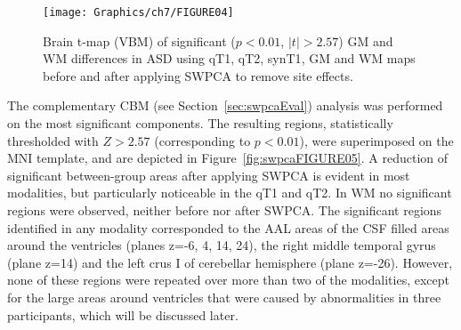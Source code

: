 \begin{figure}
	\centering
	\texttt{[image: Graphics/ch7/FIGURE04]}
	\caption[Brain t-map (\acs{VBM}) of significant ($p<0.01$, $|t|>2.57$) \acs{GM} and \acs{WM} differences in \acs{ASD} using \acs{qT1}, \acs{qT2}, \acs{synT1}, \acs{GM} and \acs{WM} maps before and after applying \acs{SWPCA} to remove site effects.]{Brain t-map (\ac{VBM}) of significant ($p<0.01$, $|t|>2.57$) \ac{GM} and \ac{WM} differences in \ac{ASD} using \ac{qT1}, \ac{qT2}, \ac{synT1}, \ac{GM} and \ac{WM} maps before and after applying \ac{SWPCA} to remove site effects.}
	\label{fig:swpcaFIGURE04}
\end{figure}

The complementary CBM (see Section~\ref{sec:swpcaEval}) analysis was performed on the most significant components. The resulting regions, statistically thresholded with $Z>2.57$ (corresponding to $p<0.01$), were superimposed on the \ac{MNI} template, and are depicted in Figure~\ref{fig:swpcaFIGURE05}. A reduction of significant between-group areas after applying \ac{SWPCA} is evident in most modalities, but particularly noticeable in the \ac{qT1} and \ac{qT2}. In \ac{WM} no significant regions were observed, neither before nor after \ac{SWPCA}. The significant regions identified in any modality corresponded to the \ac{AAL} areas of the \ac{CSF} filled areas around the ventricles (planes z=-6, 4, 14, 24), the right middle temporal gyrus (plane z=14) and the left crus I of cerebellar hemisphere (plane z=-26). However, none of these regions were repeated over more than two of the modalities, except for the large areas around ventricles that were caused by abnormalities in three participants, which will be discussed later.

